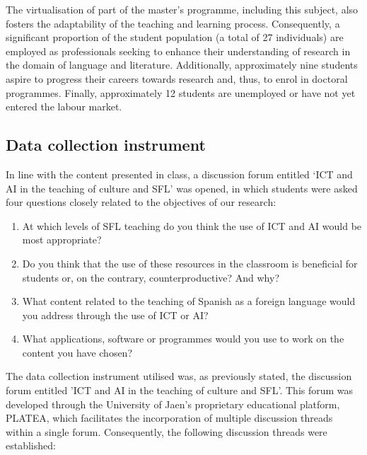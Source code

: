 \documentclass[english]{textolivre}
\begin{document}
The virtualisation of part of the master's programme, including this subject, also fosters the adaptability of the teaching and learning process. Consequently, a significant proportion of the student population (a total of 27 individuals) are employed as professionals seeking to enhance their understanding of research in the domain of language and literature. Additionally, approximately nine students aspire to progress their careers towards research and, thus, to enrol in doctoral programmes. Finally, approximately 12 students are unemployed or have not yet entered the labour market.

\subsection{Data collection instrument}
In line with the content presented in class, a discussion forum entitled ‘ICT and AI in the teaching of culture and SFL’ was opened, in which students were asked four questions closely related to the objectives of our research:

\begin{enumerate}
    \item At which levels of SFL teaching do you think the use of ICT and AI would be most appropriate?
    \item Do you think that the use of these resources in the classroom is beneficial for students or, on the contrary, counterproductive? And why?
    \item What content related to the teaching of Spanish as a foreign language would you address through the use of ICT or AI?
    \item What applications, software or programmes would you use to work on the content you have chosen?
\end{enumerate}

The data collection instrument utilised was, as previously stated, the discussion forum entitled 'ICT and AI in the teaching of culture and SFL'. This forum was developed through the University of Jaen's proprietary educational platform, PLATEA, which facilitates the incorporation of multiple discussion threads within a single forum. Consequently, the following discussion threads were established:
\end{document}
